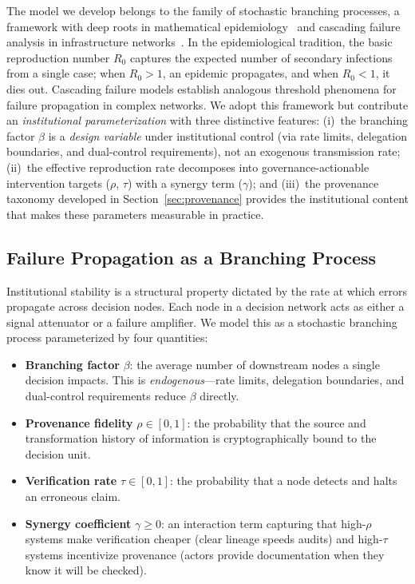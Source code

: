 \documentclass[runningheads]{llncs}
\begin{document}
The model we develop belongs to the family of stochastic branching processes, a framework with deep roots in mathematical epidemiology~\cite{anderson1991infectious,hethcote2000mathematics} and cascading failure analysis in infrastructure networks~\cite{watts2002simple,buldyrev2010catastrophic,dobson2024cascading}. In the epidemiological tradition, the basic reproduction number $R_0$ captures the expected number of secondary infections from a single case; when $R_0 > 1$, an epidemic propagates, and when $R_0 < 1$, it dies out. Cascading failure models establish analogous threshold phenomena for failure propagation in complex networks. We adopt this framework but contribute an \emph{institutional parameterization} with three distinctive features: (i)~the branching factor $\beta$ is a \emph{design variable} under institutional control (via rate limits, delegation boundaries, and dual-control requirements), not an exogenous transmission rate; (ii)~the effective reproduction rate decomposes into governance-actionable intervention targets ($\rho$, $\tau$) with a synergy term ($\gamma$); and (iii)~the provenance taxonomy developed in Section~\ref{sec:provenance} provides the institutional content that makes these parameters measurable in practice.

\subsection{Failure Propagation as a Branching Process}

Institutional stability is a structural property dictated by the rate at which errors propagate across decision nodes. Each node in a decision network acts as either a signal attenuator or a failure amplifier. We model this as a stochastic branching process parameterized by four quantities:

\begin{itemize}
\item \textbf{Branching factor} $\beta$: the average number of downstream nodes a single decision impacts. This is \emph{endogenous}---rate limits, delegation boundaries, and dual-control requirements reduce $\beta$ directly.
\item \textbf{Provenance fidelity} $\rho \in [0,1]$: the probability that the source and transformation history of information is cryptographically bound to the decision unit.
\item \textbf{Verification rate} $\tau \in [0,1]$: the probability that a node detects and halts an erroneous claim.
\item \textbf{Synergy coefficient} $\gamma \geq 0$: an interaction term capturing that high-$\rho$ systems make verification cheaper (clear lineage speeds audits) and high-$\tau$ systems incentivize provenance (actors provide documentation when they know it will be checked).
\end{itemize}
\end{document}
